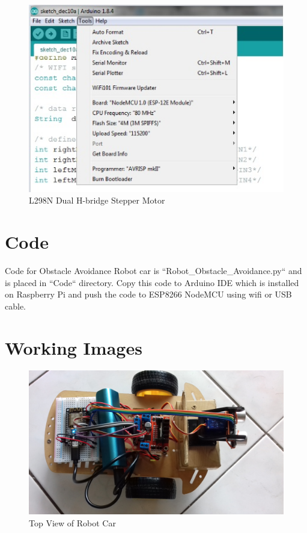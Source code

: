 \documentclass[sigconf]{acmart}
\begin{document}
\begin{figure}
	\includegraphics[width=1.0\columnwidth]{images/Arduino-settings.jpg}
	\caption{L298N Dual H-bridge Stepper Motor}
\end{figure}

\section{Code}
Code for Obstacle Avoidance Robot car is ``Robot_Obstacle_Avoidance.py`` and is placed in ``Code`` directory. Copy this code to Arduino IDE which is installed on Raspberry Pi and push the code to ESP8266 NodeMCU using wifi or USB cable.

\section{Working Images}

\begin{figure}
	\includegraphics[width=1.0\columnwidth]{images/Top-view.jpg}
	\caption{Top View of Robot Car}
\end{figure}
\end{document}
